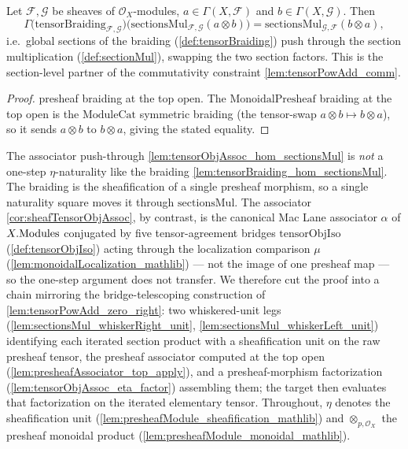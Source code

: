 \begin{lemma}\leanok
  \label{lem:tensorBraiding_hom_sectionsMul}
  Let \(\mathcal{F}, \mathcal{G}\) be sheaves of \(\mathcal{O}_X\)-modules,
  \(a \in \Gamma(X,\mathcal{F})\) and \(b \in \Gamma(X,\mathcal{G})\). Then
  \[
    \Gamma\bigl(\mathrm{tensorBraiding}_{\mathcal{F},\mathcal{G}}\bigr)
      \bigl(\mathrm{sectionsMul}_{\mathcal{F},\mathcal{G}}(a \otimes b)\bigr)
      = \mathrm{sectionsMul}_{\mathcal{G},\mathcal{F}}(b \otimes a),
  \]
  i.e.\ global sections of the braiding (\cref{def:tensorBraiding}) push through
  the section multiplication (\cref{def:sectionMul}), swapping the two section
  factors. This is the section-level partner of the commutativity constraint
  \cref{lem:tensorPowAdd_comm}.
\end{lemma}

\begin{proof}
  \leanok
  presheaf braiding at the top open. The
  \(\mathrm{MonoidalPresheaf}\) braiding at the top open is the
  \(\mathrm{ModuleCat}\) symmetric braiding (the tensor-swap
  \(a \otimes b \mapsto b \otimes a\)), so it sends \(a \otimes b\) to
  \(b \otimes a\), giving the stated equality.
\end{proof}

The associator push-through \cref{lem:tensorObjAssoc_hom_sectionsMul} is \emph{not}
a one-step \(\eta\)-naturality like the braiding
\cref{lem:tensorBraiding_hom_sectionsMul}. The braiding is the sheafification of a
single presheaf morphism, so a single naturality square moves it through
\(\mathrm{sectionsMul}\). The associator \cref{cor:sheafTensorObjAssoc}, by
contrast, is the canonical Mac Lane associator \(\alpha\) of \(X.\mathrm{Modules}\)
conjugated by five tensor-agreement bridges \(\mathrm{tensorObjIso}\)
(\cref{def:tensorObjIso}) acting through the localization comparison \(\mu\)
(\cref{lem:monoidalLocalization_mathlib}) --- not the image of one presheaf map ---
so the one-step argument does not transfer. We therefore cut the proof into a chain
mirroring the bridge-telescoping construction of
\cref{lem:tensorPowAdd_zero_right}: two whiskered-unit legs
(\cref{lem:sectionsMul_whiskerRight_unit},
\cref{lem:sectionsMul_whiskerLeft_unit}) identifying each iterated section product
with a sheafification unit on the raw presheaf tensor, the presheaf associator
computed at the top open (\cref{lem:presheafAssociator_top_apply}), and a
presheaf-morphism factorization (\cref{lem:tensorObjAssoc_eta_factor}) assembling
them; the target then evaluates that factorization on the iterated elementary
tensor. Throughout, \(\eta\) denotes the sheafification unit
(\cref{lem:presheafModule_sheafification_mathlib}) and \(\otimes_{p,\mathcal{O}_X}\)
the presheaf monoidal product (\cref{lem:presheafModule_monoidal_mathlib}).

